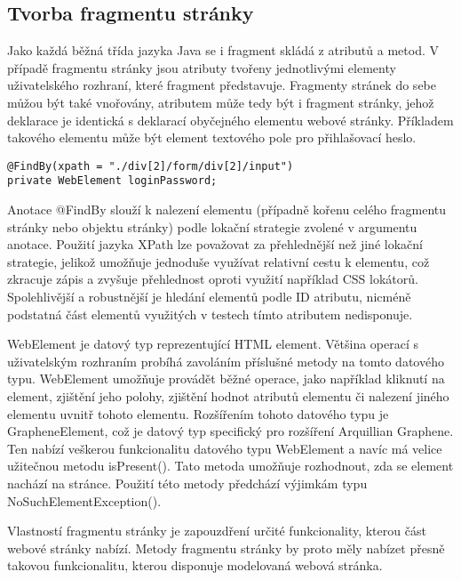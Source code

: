 \documentclass[
    color,   %
	table,   %
    twoside, %
    nolot, nolof
]{fithesis3}
\begin{document}
\subsection*{Tvorba fragmentu stránky}

Jako každá běžná třída jazyka Java se i fragment skládá z atributů a metod. V případě fragmentu stránky jsou atributy tvořeny jednotlivými elementy uživatelského rozhraní, které fragment představuje. Fragmenty stránek do sebe můžou být také vnořovány, atributem může tedy být i fragment stránky, jehož deklarace je identická s deklarací obyčejného elementu webové stránky. Příkladem takového elementu může být element textového pole pro přihlašovací heslo. 

\begin{lstlisting}
@FindBy(xpath = "./div[2]/form/div[2]/input")
private WebElement loginPassword;
\end{lstlisting} 

Anotace @FindBy slouží k nalezení elementu (případně kořenu celého fragmentu stránky nebo objektu stránky) podle lokační strategie zvolené v argumentu anotace. Použití jazyka XPath lze považovat za přehlednější než jiné lokační strategie, jelikož umožňuje jednoduše využívat relativní cestu k elementu, což zkracuje zápis a zvyšuje přehlednost oproti využití například CSS lokátorů. Spolehlivější a robustnější je hledání elementů podle ID atributu, nicméně podstatná část elementů využitých v testech tímto atributem nedisponuje.

WebElement je datový typ reprezentující HTML element. Většina operací s uživatelským rozhraním probíhá zavoláním příslušné metody na tomto datového typu. WebElement umožňuje provádět běžné operace, jako například kliknutí na element, zjištění jeho polohy, zjištění hodnot atributů elementu či nalezení jiného elementu uvnitř tohoto elementu. Rozšířením tohoto datového typu je GrapheneElement, což je datový typ specifický pro rozšíření Arquillian Graphene. Ten nabízí veškerou funkcionalitu datového typu WebElement a navíc má velice užitečnou metodu isPresent(). Tato metoda umožňuje rozhodnout, zda se element nachází na stránce. Použití této metody předchází výjimkám typu NoSuchElementException().

Vlastností fragmentu stránky je zapouzdření určité funkcionality, kterou část webové stránky nabízí. Metody fragmentu stránky by proto měly nabízet přesně takovou funkcionalitu, kterou disponuje modelovaná webová stránka.
\end{document}
